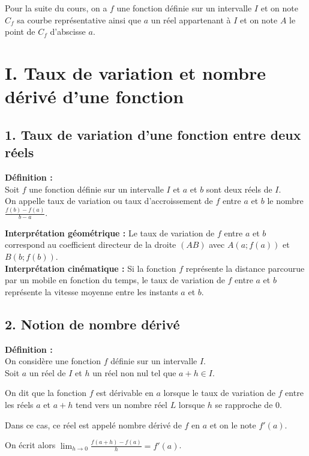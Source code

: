\documentclass[11pt,a4paper]{article}
\title{\titre}
\author{\classe \\ \theme}
\date{}
\begin{document}
\maketitle
\pagestyle{custom}
\thispagestyle{custom}

Pour la suite du cours, on a $f$ une fonction définie sur un intervalle $I$ et on note $C_f$ sa courbe représentative ainsi que $a$ un réel appartenant à $I$ et on note $A$ le point de $C_f$ d'abscisse $a$.

\section*{I. Taux de variation et nombre dérivé d'une fonction}
\subsection*{1. Taux de variation d'une fonction entre deux réels}

\begin{mdframed}[style=definitionStyle]
    \textbf{Définition :} ~\\
    Soit $f$ une fonction définie sur un intervalle $I$ et $a$ et $b$ sont deux réels de $I$. ~\\
    On appelle taux de variation ou taux d'accroissement de $f$ entre $a$ et $b$ le nombre $\displaystyle{\frac{f(b)-f(a)}{b-a}}$.
\end{mdframed}

\textbf{Interprétation géométrique :} Le taux de variation de $f$ entre $a$ et $b$ correspond au coefficient directeur
de la droite $(AB)$ avec $A(a; f(a))$ et $B(b; f(b))$. \\

\textbf{Interprétation cinématique :} Si la fonction $f$ représente la distance parcourue par un mobile en fonction du temps, le taux de variation de $f$ entre $a$ et $b$ représente la vitesse moyenne entre les instants $a$ et $b$.

\subsection*{2. Notion de nombre dérivé}

\begin{mdframed}[style=definitionStyle]
    \textbf{Définition :} ~\\
    On considère une fonction $f$ définie sur un intervalle $I$. \\
    Soit $a$ un réel de $I$ et $h$ un réel non nul tel que $a+h\in I$.

    On dit que la fonction $f$ est dérivable en $a$ lorsque le taux de variation de $f$ entre les réels $a$ et $a+h$ tend vers un nombre réel $L$ lorsque $h$ se rapproche de $0$.

    Dans ce cas, ce réel est appelé nombre dérivé de $f$ en $a$ et on le note $f'(a)$.

    On écrit alors $\displaystyle{\lim_{h\to0}%
            \frac{f(a+h)-f(a)}{h}}=f'(a)$.
\end{mdframed}
\end{document}
